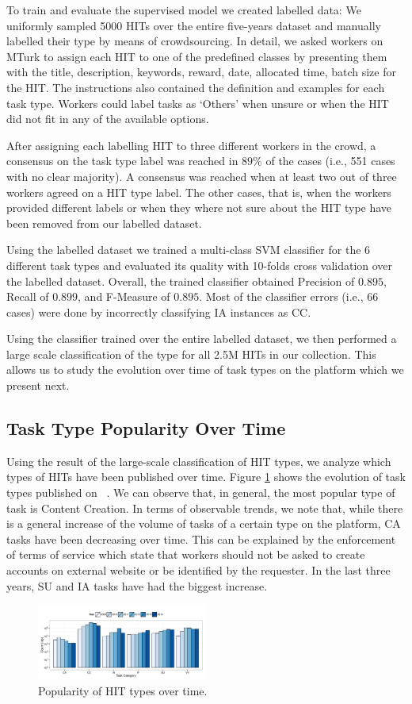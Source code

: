 To train and evaluate the supervised model we created labelled data: We uniformly sampled 5000 HITs over the entire five-years dataset and manually labelled their type by means of crowdsourcing. In detail, we asked workers on MTurk to assign each HIT to one of the predefined classes by presenting them with the title, description, keywords, reward, date, allocated time, batch size for the HIT. The instructions also contained the definition and examples for each task type. Workers could label tasks as `Others' when unsure or when the HIT did not fit in any of the available options.

After assigning each labelling HIT to three different workers in the crowd, a consensus on the task type label was reached in $89\%$ of the cases (i.e., 551 cases with no clear majority). A consensus was reached when at least two out of three workers agreed on a HIT type label. The other cases, that is, when the workers provided different labels or when they where not sure about the HIT type have been removed from our labelled dataset.

Using the labelled dataset we trained a multi-class SVM classifier for the 6 different task types and evaluated its quality with 10-folds cross validation over the labelled dataset. Overall, the trained classifier obtained Precision of $0.895$, Recall of $0.899$, and F-Measure of $0.895$. Most of the classifier errors (i.e., 66 cases) were done by incorrectly classifying IA instances as CC.


Using the classifier trained over the entire labelled dataset, we then performed a large scale classification of the type for all 2.5M HITs in our collection. This allows us to study the evolution over time of task types on the \amt{} platform which we present next.

\subsection{Task Type Popularity Over Time}
Using the result of the large-scale classification of HIT types, we  analyze which  types of HITs have been published over time.
Figure \ref{fig:cat_trends} shows the evolution of task types published on \amt{}\ .
% 
We can observe that, in general, the most popular type of task is Content Creation.
% 
In terms of observable trends, we note that, while there is a general increase of the volume of tasks of a certain type on the platform,  CA tasks have been decreasing over time. This can be explained  by the enforcement of \amt{} terms of service which state that workers should not be asked to create accounts on external website or be identified by the requester.
% 
In the last three years, SU and IA tasks have had the biggest increase.

\begin{figure}[htbp]
	\centering
		\includegraphics[width=0.5\textwidth]{figures/category_trends}
	\caption{Popularity of HIT types over time.}
	\label{fig:cat_trends}
\end{figure}

